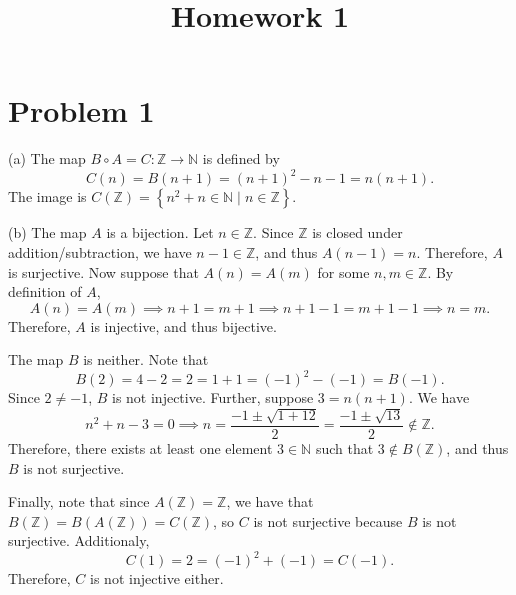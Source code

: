 \documentclass[11pt, letterpaper]{article}
\title{Homework 1}
\begin{document}
\makeproblem

\section*{Problem 1}
(a) The map $B\circ A=C : \mathbb{Z} \to \mathbb{N}$ is defined by
\[
	C(n)=B(n+1)=(n+1)^2-n-1 = n(n+1)
.\]
The image is $C(\mathbb{Z})=\left\{ n^2+n\in\mathbb{N} \mid n\in\mathbb{Z} \right\} $.

(b) The map $A$ is a bijection. Let $n\in\mathbb{Z}$. Since $\mathbb{Z}$ is closed under addition/subtraction, we have $n-1\in\mathbb{Z}$, and thus $A(n-1)=n$. Therefore, $A$ is surjective. Now suppose that $A(n)=A(m)$ for some $n,m\in\mathbb{Z}$. By definition of $A$,
\[
	A(n)=A(m)\implies n+1=m+1 \implies n+1-1 = m+1-1 \implies n=m
.\]
Therefore, $A$ is injective, and thus bijective.

The map $B$ is neither. Note that
\[
	B(2)=4-2=2=1+1=(-1)^2-\left( -1 \right) =B(-1)
.\]
Since $2\neq -1$, $B$ is not injective. Further, suppose $3=n(n+1)$. We have
\[
	n^2+n-3=0 \implies n= \frac{-1 \pm \sqrt{1+12} }{2}=\frac{-1\pm \sqrt{13} }{2}\notin \mathbb{Z}
.\]
Therefore, there exists at least one element $3\in\mathbb{N}$ such that $3\notin B(\mathbb{Z})$, and thus $B$ is not surjective.

Finally, note that since $A(\mathbb{Z})=\mathbb{Z}$, we have that $B(\mathbb{Z})=B(A(\mathbb{Z}))=C(\mathbb{Z})$, so $C$ is not surjective because $B$ is not surjective. Additionaly,
\[
	C(1)=2=(-1)^2+(-1)=C(-1)
.\]
Therefore, $C$ is not injective either.
\end{document}

